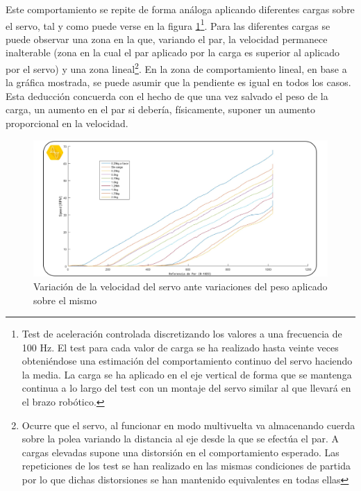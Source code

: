 Este comportamiento se repite de forma análoga aplicando diferentes cargas sobre el servo, tal y como puede verse en la figura \ref{fig:Control:control_velocidad_par_2}\footnote{Test de aceleración controlada discretizando los valores a una frecuencia de 100 Hz. El test para cada valor de carga se ha realizado hasta veinte veces obteniéndose una estimación del comportamiento continuo del servo haciendo la media. La carga se ha aplicado en el eje vertical de forma que se mantenga continua a lo largo del test con un montaje del servo similar al que llevará en el brazo robótico.}. Para las diferentes cargas se puede observar una zona en la que, variando el par, la velocidad permanece inalterable (zona en la cual el par aplicado por la carga es superior al aplicado por el servo) y una zona lineal\footnote{Ocurre que el servo, al funcionar en modo multivuelta va almacenando cuerda sobre la polea variando la distancia al eje desde la que se efectúa el par. A cargas elevadas supone una distorsión en el comportamiento esperado. Las repeticiones de los test se han realizado en las mismas condiciones de partida por lo que dichas distorsiones se han mantenido equivalentes en todas ellas}. En la zona de comportamiento lineal, en base a la gráfica mostrada, se puede asumir que la pendiente es igual en todos los casos. Esta deducción concuerda con el hecho de que una vez salvado el peso de la carga, un aumento en el par si debería, físicamente, suponer un aumento proporcional en la velocidad.
\\

\begin{figure}
    \centering
    \includegraphics[width=1\textwidth]{figuras/Imagenes_Control/Control_2.jpg}
    \caption{Variación de la velocidad del servo ante variaciones del peso aplicado sobre el mismo}
    \label{fig:Control:control_velocidad_par_2}
\end{figure}


